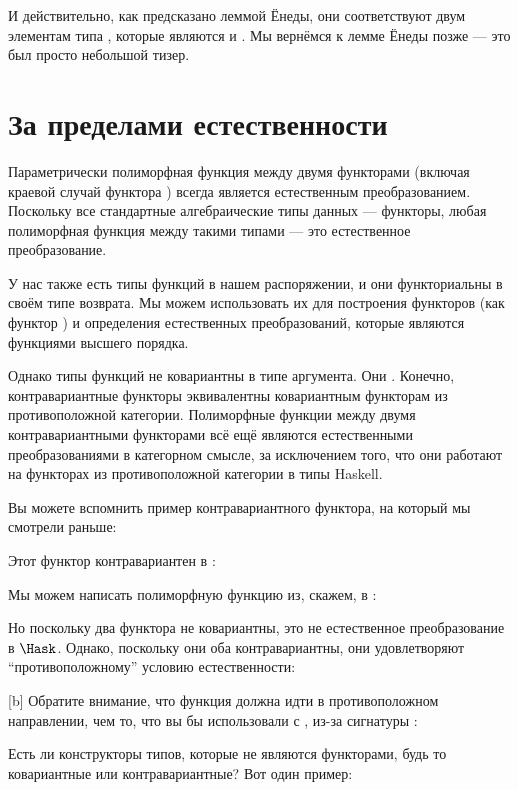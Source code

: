 И действительно, как предсказано леммой Ёнеды, они соответствуют
двум элементам типа , которые являются 
и . Мы вернёмся к лемме Ёнеды позже ---
это был просто небольшой тизер.

\section{За пределами естественности}

Параметрически полиморфная функция между двумя функторами (включая
краевой случай функтора ) всегда является естественным
преобразованием. Поскольку все стандартные алгебраические типы данных --- функторы,
любая полиморфная функция между такими типами --- это естественное преобразование.

У нас также есть типы функций в нашем распоряжении, и они функториальны в
своём типе возврата. Мы можем использовать их для построения функторов (как
функтор ) и определения естественных преобразований, которые являются
функциями высшего порядка.

Однако типы функций не ковариантны в типе аргумента. Они
. Конечно, контравариантные функторы эквивалентны
ковариантным функторам из противоположной категории. Полиморфные функции
между двумя контравариантными функторами всё ещё являются естественными преобразованиями в
категорном смысле, за исключением того, что они работают на функторах из
противоположной категории в типы Haskell.

Вы можете вспомнить пример контравариантного функтора, на который мы смотрели
раньше:

Этот функтор контравариантен в :

Мы можем написать полиморфную функцию из, скажем,  в
:

Но поскольку два функтора не ковариантны, это не естественное
преобразование в $\Hask$. Однако, поскольку они оба
контравариантны, они удовлетворяют ``противоположному'' условию естественности:

[b]
Обратите внимание, что функция  должна идти в противоположном направлении,
чем то, что вы бы использовали с , из-за сигнатуры
:

Есть ли конструкторы типов, которые не являются функторами, будь то ковариантные
или контравариантные? Вот один пример:

